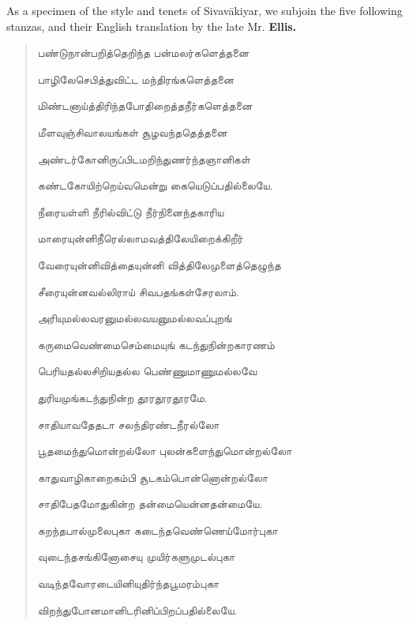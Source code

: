 \documentclass{article}
\newcommand{\TamilText}[1]{\texttamil{#1}}
\newcommand{\tam}[1]{\TamilText{#1}}
\begin{document}
As a specimen of the style and tenets of Sivav\={a}kiyar, we subjoin the five following stanzas, and their English translation by the late Mr. \textbf{Ellis.}
\begin{quotation}\small
\tam{பண்டுநான்பறித்தெறிந்த பன்மலர்களெத்தனை}

\tam{பாழிலேசெபித்துவிட்ட மந்திரங்களெத்தனை}

\tam{மிண்டனாய்த்திரிந்தபோதிறைத்தநீர்களெத்தனை}

\tam{மீளவுஞ்சிவாலயங்கள்‌ சூழவந்ததெத்தனை}

\tam{அண்டர்கோனிருப்பிடமறிந்துணர்ந்தஞானிகள்‌}

\tam{கண்டகோயிற்றெய்வமென்று கையெடுப்பதில்லையே}.

\bigskip

\tam{நீரையள்ளி நீரில்விட்டு நீர்நினைந்தகாரிய}

\tam{மாரையுன்னிநீரெல்லாமவத்திலேயிறைக்கிறீர்‌}

\tam{வேரையுன்னிவித்தையுன்னி வித்திலேமுளைத்தெழுந்த}

\tam{சீரையுன்னவல்லிராய்‌ சிவபதங்கள்சேரலாம்‌}.

\bigskip

\tam{அரியுமல்லவரனுமல்லவயனுமல்லவப்புறங்}

\tam{கருமைவெண்மைசெம்மையுங் கடந்துநின்றகாரணம்‌}

\tam{பெரியதல்லசிறியதல்ல பெண்ணுமாணுமல்லவே}

\tam{துரியமுங்கடந்துநின்ற தூரதூரதூரமே}.

\bigskip

\tam{சாதியாவதேதடா சலந்திரண்டநீரல்லோ}

\tam{பூதமைந்துமொன்றல்லோ புலன்களைந்துமொன்றல்லோ}

\tam{காதுவாழிகாறைகம்பி சூடகம்பொன்னொன்றல்லோ}

\tam{சாதிபேதமோதுகின்ற தன்மையென்னதன்மையே}.

\bigskip

\tam{கறந்தபால்முலைபுகா கடைந்தவெண்ணெய்மோர்புகா}

\tam{வுடைந்தசங்கினோசையு முயிர்களுமுடல்புகா}

\tam{வடிந்தவோரடையினியுதிர்ந்தபூமரம்புகா}

\tam{விறந்துபோனமானிடரினிப்பிறப்பதில்லையே}.
\end{quotation}
\end{document}
